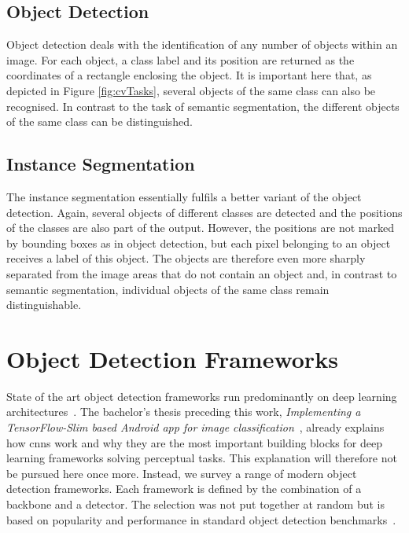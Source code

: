 \documentclass[
			   fontsize=11pt,
               paper=a4,
               bibliography=totoc,
               idxtotoc,
               headsepline,
               footsepline,
               footinclude=false,
               BCOR=12mm,
               DIV=13,
               openany,   %
               ]
               {scrbook}
\begin{document}
\subsection{Object Detection}
Object detection deals with the identification of any number of objects within an image. For each object, a class label and its position are returned as the coordinates of a rectangle enclosing the object. It is important here that, as depicted in Figure \autoref{fig:cvTasks}, several objects of the same class can also be recognised. In contrast to the  task of semantic segmentation, the different objects of the same class can be distinguished.

\subsection{Instance Segmentation}
The instance segmentation essentially fulfils a better variant of the object detection. Again, several objects of different classes are detected and the positions of the classes are also part of the output. However, the positions are not marked by bounding boxes as in object detection, but each pixel belonging to an object receives a label of this object. The objects are therefore even more sharply separated from the image areas that do not contain an object and, in contrast to semantic segmentation, individual objects of the same class remain distinguishable.


\section{Object Detection Frameworks}

State of the art object detection frameworks run predominantly on deep learning architectures~\cite{dlForDetection}. The bachelor's thesis preceding this work, \textit{Implementing a TensorFlow-Slim based Android app for image classification}~\cite{maxJokel}, already explains how \glspl{cnn} work and why they are the most important building blocks for deep learning frameworks solving perceptual tasks. This explanation will therefore not be pursued here once more. Instead, we survey a range of modern object detection frameworks. Each framework is defined by the combination of a backbone and a detector. The selection was not put together at random but is based on popularity and performance in standard object detection benchmarks~\cite{backbones}. %
\end{document}
